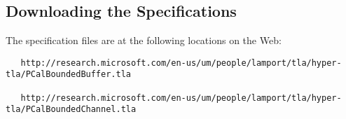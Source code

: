 \documentclass[fleqn,leqno]{article}
\begin{document}
\subsection*{Downloading the Specifications}

\vspace{.5em}

The specification files are at the following locations on the Web:
\footnotesize
\begin{verbatim}
   http://research.microsoft.com/en-us/um/people/lamport/tla/hyper-tla/PCalBoundedBuffer.tla
   
   http://research.microsoft.com/en-us/um/people/lamport/tla/hyper-tla/PCalBoundedChannel.tla
\end{verbatim}
\end{document}
